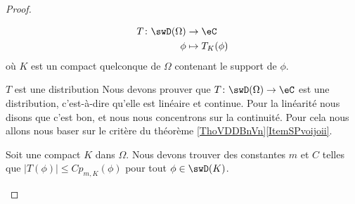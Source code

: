 \begin{proof}
\begin{subproof}
        \begin{equation}
            \begin{aligned}
                T\colon \swD(\Omega)&\to \eC \\
                \phi&\mapsto T_K(\phi) 
            \end{aligned}
        \end{equation}
        où \( K\) est un compact quelconque de \( \Omega\) contenant le support de \( \phi\).
    \item[$ T$ est une distribution]
        Nous devons prouver que \( T\colon\swD(\Omega) \to \eC\) est une distribution, c'est-à-dire qu'elle est linéaire et continue. Pour la linéarité nous disons que c'est bon, et nous nous concentrons sur la continuité. Pour cela nous allons nous baser sur le critère du théorème \ref{ThoVDDBnVn}\ref{ItemSPvoijoii}.

        Soit une compact \( K\) dans \( \Omega\). Nous devons trouver des constantes \( m\) et \( C\) telles que \( |T(\phi)|\leq Cp_{m,K}(\phi)\) pour tout \( \phi\in \swD(K)\).


\end{subproof}
\end{proof}
